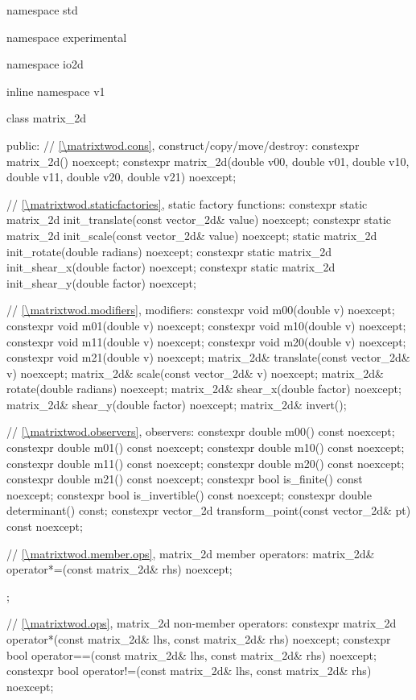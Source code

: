 \begin{codeblock}
namespace std { namespace experimental { namespace io2d { inline namespace v1 {
  class matrix_2d {
  public:
    // \ref{\matrixtwod.cons}, construct/copy/move/destroy:
    constexpr matrix_2d() noexcept;
    constexpr matrix_2d(double v00, double v01, double v10, double v11,
      double v20, double v21) noexcept;
    
    // \ref{\matrixtwod.staticfactories}, static factory functions:
    constexpr static matrix_2d init_translate(const vector_2d& value) noexcept;
    constexpr static matrix_2d init_scale(const vector_2d& value) noexcept;
    static matrix_2d init_rotate(double radians) noexcept;
    constexpr static matrix_2d init_shear_x(double factor) noexcept;
    constexpr static matrix_2d init_shear_y(double factor) noexcept;
    
    // \ref{\matrixtwod.modifiers}, modifiers:
    constexpr void m00(double v) noexcept;
    constexpr void m01(double v) noexcept;
    constexpr void m10(double v) noexcept;
    constexpr void m11(double v) noexcept;
    constexpr void m20(double v) noexcept;
    constexpr void m21(double v) noexcept;
    matrix_2d& translate(const vector_2d& v) noexcept;
    matrix_2d& scale(const vector_2d& v) noexcept;
    matrix_2d& rotate(double radians) noexcept;
    matrix_2d& shear_x(double factor) noexcept;
    matrix_2d& shear_y(double factor) noexcept;
    matrix_2d& invert();
    
    // \ref{\matrixtwod.observers}, observers:
    constexpr double m00() const noexcept;
    constexpr double m01() const noexcept;
    constexpr double m10() const noexcept;
    constexpr double m11() const noexcept;
    constexpr double m20() const noexcept;
    constexpr double m21() const noexcept;
    constexpr bool is_finite() const noexcept;
    constexpr bool is_invertible() const noexcept;
    constexpr double determinant() const;
    constexpr vector_2d transform_point(const vector_2d& pt) const noexcept;
    
    // \ref{\matrixtwod.member.ops}, matrix_2d member operators:
    matrix_2d& operator*=(const matrix_2d& rhs) noexcept;
  };
    
  // \ref{\matrixtwod.ops}, matrix_2d non-member operators:
  constexpr matrix_2d operator*(const matrix_2d& lhs, const matrix_2d& rhs)
    noexcept;
  constexpr bool operator==(const matrix_2d& lhs, const matrix_2d& rhs)
    noexcept;
  constexpr bool operator!=(const matrix_2d& lhs, const matrix_2d& rhs)
    noexcept;
} } } }
\end{codeblock}

